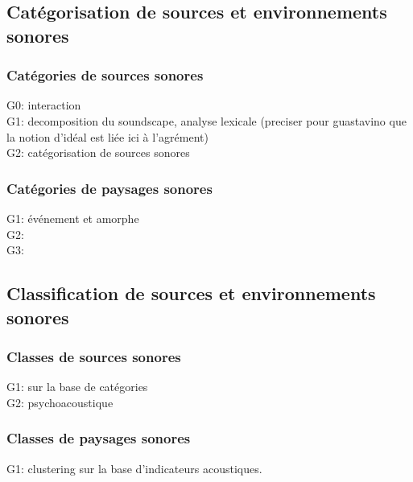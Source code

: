 \subsection{Catégorisation de sources et environnements sonores}

\subsubsection{Catégories de sources sonores}

G0: \citep{gaver1993world} interaction \\
G1: \citep{guastavino2006ideal,szeremeta2009analysis} decomposition du soundscape, analyse lexicale (preciser pour guastavino que la notion d'idéal est liée ici à l'agrément) \\
G2: \citep{Houix03f,guastavino2007categorization,gygi2007similarity,houix_lexical_2012} catégorisation de sources sonores

\subsubsection{Catégories de paysages sonores}
\label{sec:ch3_catsoundscape}

G1: \citep{maffiolo_caracterisation_1999} événement et amorphe\\
G2: \citep{jeon2013soundwalk}\\
G3: \citep{brown2011towards}

\subsection{Classification de sources et environnements sonores}

\subsubsection{Classes de sources sonores}

G1: \citep{niessen2010categories,park14} sur la base de catégories\\
G2: \citep{yang2013psychoacoustical} psychoacoustique

\subsubsection{Classes de paysages sonores}

G1: \citep{rychtarikova2013soundscape,torija2013application} clustering sur la base d'indicateurs acoustiques.

